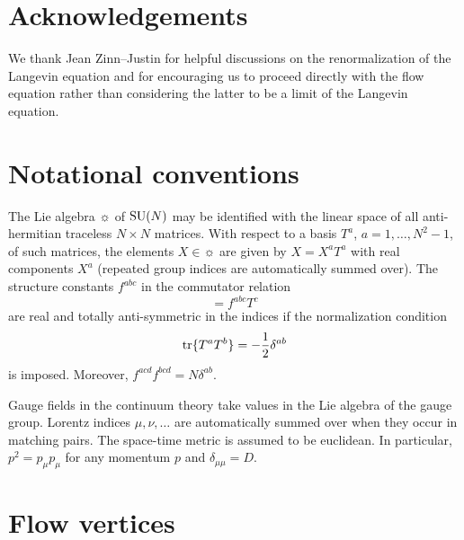 \section*{Acknowledgements}
We thank Jean Zinn--Justin for helpful discussions on
the renormalization of the Langevin equation and for encouraging us
to proceed directly with the flow equation rather than considering
the latter to be a limit of the Langevin equation.

\appendix

\section{Notational conventions}\label{app:A}

The Lie algebra $\sun$ of $\mathrm{SU}(N)$
may be identified with the linear space of all anti-hermitian
traceless $N\times N$ matrices.
With respect to a
basis $T^a$, $a=1,\ldots,N^2-1$, of such matrices,
the elements $X\in\sun$ are given by
$X=X^aT^a$ with real components $X^a$
(repeated group indices are automatically summed over).
The structure constants $f^{abc}$ in
the commutator relation
\begin{equation}
  [T^a,T^b]=f^{abc}T^c
  \label{eq:A.1}
\end{equation}
are real and totally anti-symmetric in the indices if
the normalization condition
\begin{equation}
  \mathrm{tr}\{T^aT^b\}=-\frac{1}{2}\delta^{ab}
  \label{eq:A.2}
\end{equation}
is imposed.
Moreover, $f^{acd}f^{bcd}=N\delta^{ab}$.

Gauge fields in the continuum theory
take values in the Lie algebra of the gauge group.
Lorentz indices $\mu,\nu,\ldots$ are automatically
summed over when they occur in matching pairs.
The space-time metric is assumed to be euclidean. In particular,
$p^2=p_{\mu}p_{\mu}$ for any momentum $p$ and $\delta_{\mu\mu}=D$.

\section{Flow vertices}\label{app:B}

